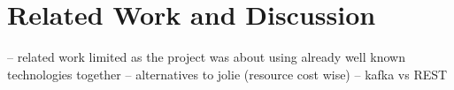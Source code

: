 
\section{Related Work and Discussion}\label{sec:relatedWorkAndDiscussion}

-- related work limited as the project was about using already well known technologies together
-- alternatives to jolie (resource cost wise)
-- kafka vs REST